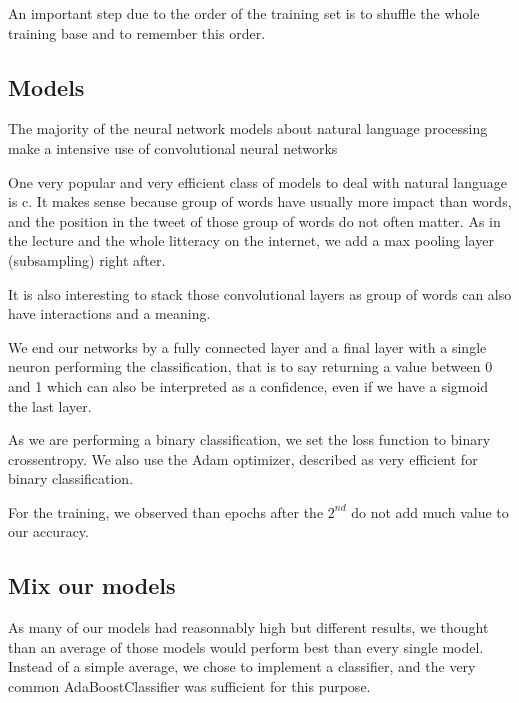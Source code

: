 \documentclass[10pt,conference,compsocconf]{IEEEtran}
\begin{document}
An important step due to the order of the training set is to shuffle the whole training base and to remember this order.

\subsection{Models}

The majority of the neural network models about natural language processing make a intensive use of convolutional neural networks

One very popular and very efficient class of models to deal with natural language is c. It makes sense because group of words have usually more impact than words, and the position in the tweet of those group of words do not often matter.
As in the lecture and the whole litteracy on the internet, we add a max pooling layer (subsampling) right after.

It is also interesting to stack those convolutional layers as group of words can also have interactions and a meaning.

We end our networks by a fully connected layer and a final layer with a single neuron performing the classification, that is to say returning a value between 0 and 1 which can also be interpreted as a confidence, even if we have a sigmoid the last layer.

As we are performing a binary classification, we set the loss function to binary crossentropy. We also use the Adam optimizer, described as very efficient for binary classification.

For the training, we observed than epochs after the $2^{nd}$ do not add much value to our accuracy.

\subsection{Mix our models}

As many of our models had reasonnably high but different results, we thought than an average of those models would perform best than every single model. Instead of a simple average, we chose to implement a classifier, and the very common AdaBoostClassifier was sufficient for this purpose.
\end{document}
